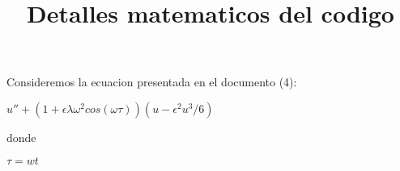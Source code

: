 \documentclass{article}
\title{Detalles matematicos del codigo}
\begin{document}
Consideremos la ecuacion presentada en el documento (4): 
\begin{center}
    $u''+(1+\epsilon \lambda \omega^2 cos(\omega \tau))(u - \epsilon^2 u^3/6)$
\end{center}
donde
\begin{center}
    $\tau = wt$
    $$
    $$
    $$
    $$
    $$
    $$
\end{center}
\end{document}
